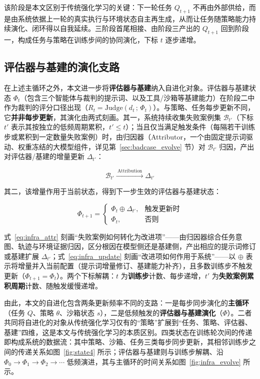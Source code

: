 该阶段是本文区别于传统强化学习的关键：下一轮任务 $Q_{t+1}$ 不再由外部供给，而是由系统依据上一轮的真实执行与环境状态自主再生成，从而让任务随策略能力持续演化、闭环得以自我延续。三阶段首尾相接、由阶段三产出的 $Q_{t+1}$ 回到阶段一，构成任务与策略在训练步间的协同演化，下标 $t$ 逐步递增。

\subsection{评估器与基建的演化支路}

在上述主循环之外，本文进一步将\textbf{评估器与基建}纳入自进化对象。评估器与基建状态 $\Phi_t$（包含三个智能体与裁判的提示词、以及工具/沙箱等基建能力）在阶段二中作为裁判的评分口径出现（$R_t = \text{Judge}(d_t\,;\,\Phi_t)$）。与策略、任务每步更新不同，它\textbf{并非每步更新}，其演化由两式刻画。其一，系统持续收集失败案例集 $\mathcal{B}_{t'}$（下标 $t'$ 表示其按独立的低频周期累积，$t' \le t$）；当且仅当满足触发条件（每隔若干训练步或累积到一定数量失败案例）时，由归因器（Attributor，一个由固定提示词驱动、权重冻结的大模型组件，详见第~\ref{sec:badcase_evolve} 节）对 $\mathcal{B}_{t'}$ 归因，产出对评估器/基建的增量更新 $\Delta_{t'}$：

\begin{equation}
\mathcal{B}_{t'} \xrightarrow{\ \text{Attribution}\ } \Delta_{t'}
\label{eq:infra_attr}
\end{equation}

其二，该增量作用于当前状态，得到下一步生效的评估器与基建状态：

\begin{equation}
\Phi_{t+1} =
\begin{cases}
\Phi_t \oplus \Delta_{t'}, & \text{触发更新时}\\[2pt]
\Phi_t, & \text{否则}
\end{cases}
\label{eq:infra_update}
\end{equation}

式~\ref{eq:infra_attr} 刻画“失败案例如何转化为改进项”——由归因器综合任务意图、轨迹与环境证据归因，区分根因在模型侧还是基建侧，产出相应的提示词修订或基建扩展 $\Delta_{t'}$；式~\ref{eq:infra_update} 刻画“改进项如何作用于系统”——以 $\oplus$ 表示将增量并入当前配置（提示词增量修订、基建能力补齐），且多数训练步不触发更新（$\Phi_{t+1}=\Phi_t$）。两个下标解耦：$t$ 为\textbf{训练步}计数、每步递增，$t'$ 为\textbf{失败案例累积周期}计数、随触发缓慢递增。

由此，本文的自进化包含两条更新频率不同的支路：一是每步同步演化的\textbf{主循环}（任务 $Q$、策略 $\theta$、沙箱状态 $s$），二是低频触发的\textbf{评估器与基建演化}（$\Phi$）。二者共同将自进化的对象从传统强化学习仅有的“策略”扩展到“任务、策略、评估器、基建”四维，这是本文与传统强化学习的本质区别。四类状态在训练轮次间的传递即构成系统的数据流：其中策略、沙箱、任务三类每步同步更新，其相邻训练步之间的传递关系如图~\ref{fig:state4} 所示；评估器与基建则与训练步解耦、沿 $\Phi_0 \to \Phi_1 \to \Phi_2 \to \cdots$ 低频演进，其与主循环的时间关系如图~\ref{fig:infra_evolve} 所示。

